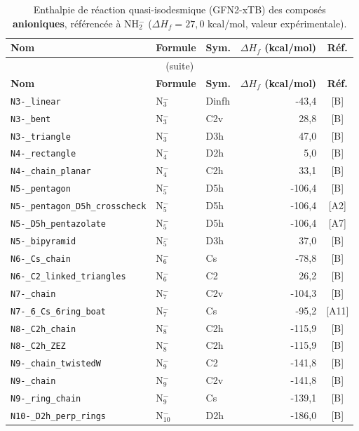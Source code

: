 \begin{longtable}{@{}p{4.6cm}lp{1.4cm}rc@{}}
\caption{Enthalpie de r\'eaction quasi-isodesmique (GFN2-xTB) des compos\'es \textbf{anioniques}, r\'ef\'erenc\'ee \`a NH$_2^-$ ($\Delta H_f=27{,}0$ kcal/mol, valeur exp\'erimentale).}
\label{tab:isodesmic-anion}\\
\toprule
\textbf{Nom} & \textbf{Formule} & \textbf{Sym.} & \textbf{$\Delta H_f$ (kcal/mol)} & \textbf{R\'ef.} \\
\midrule
\endfirsthead
\multicolumn{5}{c}{\small (suite)}\\
\toprule
\textbf{Nom} & \textbf{Formule} & \textbf{Sym.} & \textbf{$\Delta H_f$ (kcal/mol)} & \textbf{R\'ef.} \\
\midrule
\endhead
\bottomrule
\endfoot
\bottomrule
\endlastfoot
\addlinespace
\texttt{N3-\_linear} & N$_{3}^{-}$ & Dinfh & -43{,}4 & [B] \\
\texttt{N3-\_bent} & N$_{3}^{-}$ & C2v & 28{,}8 & [B] \\
\texttt{N3-\_triangle} & N$_{3}^{-}$ & D3h & 47{,}0 & [B] \\
\addlinespace
\texttt{N4-\_rectangle} & N$_{4}^{-}$ & D2h & 5{,}0 & [B] \\
\texttt{N4-\_chain\_planar} & N$_{4}^{-}$ & C2h & 33{,}1 & [B] \\
\addlinespace
\texttt{N5-\_pentagon} & N$_{5}^{-}$ & D5h & -106{,}4 & [B] \\
\texttt{N5-\_pentagon\_D5h\_crosscheck} & N$_{5}^{-}$ & D5h & -106{,}4 & [A2] \\
\texttt{N5-\_D5h\_pentazolate} & N$_{5}^{-}$ & D5h & -106{,}4 & [A7] \\
\texttt{N5-\_bipyramid} & N$_{5}^{-}$ & D3h & 37{,}0 & [B] \\
\addlinespace
\texttt{N6-\_Cs\_chain} & N$_{6}^{-}$ & Cs & -78{,}8 & [B] \\
\texttt{N6-\_C2\_linked\_triangles} & N$_{6}^{-}$ & C2 & 26{,}2 & [B] \\
\addlinespace
\texttt{N7-\_chain} & N$_{7}^{-}$ & C2v & -104{,}3 & [B] \\
\texttt{N7-\_6\_Cs\_6ring\_boat} & N$_{7}^{-}$ & Cs & -95{,}2 & [A11] \\
\addlinespace
\texttt{N8-\_C2h\_chain} & N$_{8}^{-}$ & C2h & -115{,}9 & [B] \\
\texttt{N8-\_C2h\_ZEZ} & N$_{8}^{-}$ & C2h & -115{,}9 & [B] \\
\addlinespace
\texttt{N9-\_chain\_twistedW} & N$_{9}^{-}$ & C2 & -141{,}8 & [B] \\
\texttt{N9-\_chain} & N$_{9}^{-}$ & C2v & -141{,}8 & [B] \\
\texttt{N9-\_ring\_chain} & N$_{9}^{-}$ & Cs & -139{,}1 & [B] \\
\addlinespace
\texttt{N10-\_D2h\_perp\_rings} & N$_{10}^{-}$ & D2h & -186{,}0 & [B] \\
\end{longtable}
